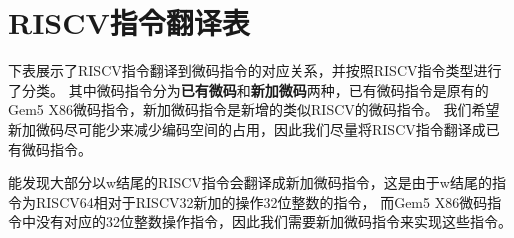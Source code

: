 \chapter{RISCV指令翻译表}

下表展示了RISCV指令翻译到微码指令的对应关系，并按照RISCV指令类型进行了分类。
其中微码指令分为\textbf{已有微码}和\textbf{新加微码}两种，已有微码指令是原有的Gem5 X86微码指令，新加微码指令是新增的类似RISCV的微码指令。
我们希望新加微码尽可能少来减少编码空间的占用，因此我们尽量将RISCV指令翻译成已有微码指令。

能发现大部分以w结尾的RISCV指令会翻译成新加微码指令，这是由于w结尾的指令为RISCV64相对于RISCV32新加的操作32位整数的指令，
而Gem5 X86微码指令中没有对应的32位整数操作指令，因此我们需要新加微码指令来实现这些指令。




